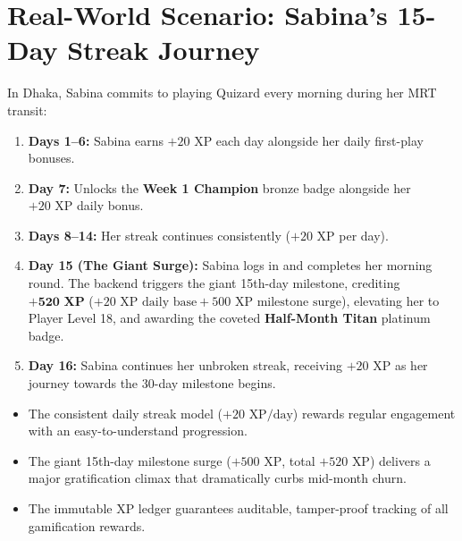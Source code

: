 \section{Real-World Scenario: Sabina's 15-Day Streak Journey}
In Dhaka, Sabina commits to playing Quizard every morning during her MRT transit:

\begin{enumerate}
    \item \textbf{Days 1--6:} Sabina earns $+20\text{ XP}$ each day alongside her daily first-play bonuses.
    \item \textbf{Day 7:} Unlocks the \textbf{Week 1 Champion} bronze badge alongside her $+20\text{ XP}$ daily bonus.
    \item \textbf{Days 8--14:} Her streak continues consistently ($+20\text{ XP}$ per day).
    \item \textbf{Day 15 (The Giant Surge):} Sabina logs in and completes her morning round. The backend triggers the giant 15th-day milestone, crediting $\mathbf{+520\text{ XP}}$ ($+20\text{ XP} \text{ daily base} + 500\text{ XP} \text{ milestone surge}$), elevating her to Player Level 18, and awarding the coveted \textbf{Half-Month Titan} platinum badge.
    \item \textbf{Day 16:} Sabina continues her unbroken streak, receiving $+20\text{ XP}$ as her journey towards the 30-day milestone begins.
\end{enumerate}

\begin{tcolorbox}[summarybox, title={Chapter Key Takeaways}]
\begin{itemize}
    \item The consistent daily streak model ($+20\text{ XP/day}$) rewards regular engagement with an easy-to-understand progression.
    \item The giant 15th-day milestone surge ($+500\text{ XP}$, total $+520\text{ XP}$) delivers a major gratification climax that dramatically curbs mid-month churn.
    \item The immutable XP ledger guarantees auditable, tamper-proof tracking of all gamification rewards.
\end{itemize}
\end{tcolorbox}
